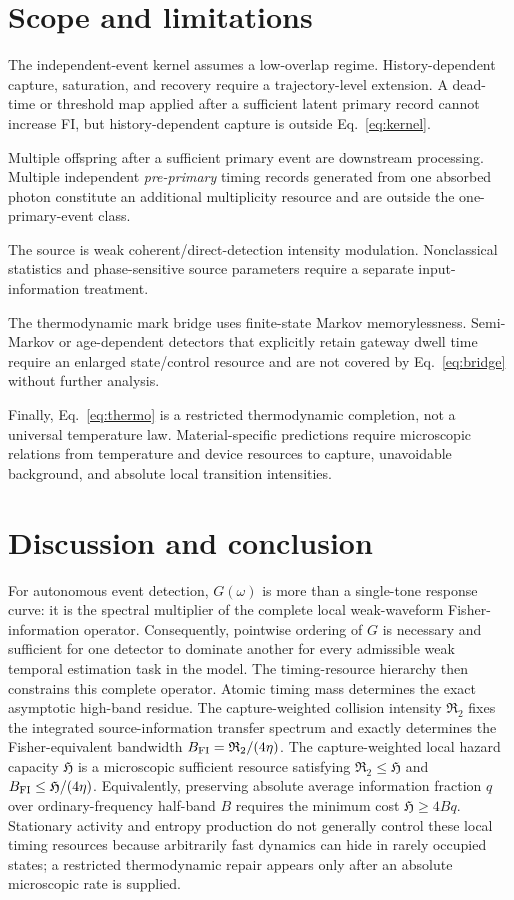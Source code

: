 \documentclass[aps,prapplied,preprint,nofootinbib]{revtex4-2}
\newcommand{\Rtwo}{\mathfrak R_2}
\newcommand{\Hcap}{\mathfrak H}
\begin{document}
\section{Scope and limitations}

The independent-event kernel assumes a low-overlap regime. History-dependent capture, saturation, and recovery require a trajectory-level extension. A dead-time or threshold map applied after a sufficient latent primary record cannot increase FI, but history-dependent capture is outside Eq.~\eqref{eq:kernel}.

Multiple offspring after a sufficient primary event are downstream processing. Multiple independent \emph{pre-primary} timing records generated from one absorbed photon constitute an additional multiplicity resource and are outside the one-primary-event class.

The source is weak coherent/direct-detection intensity modulation. Nonclassical statistics and phase-sensitive source parameters require a separate input-information treatment.

The thermodynamic mark bridge uses finite-state Markov memorylessness. Semi-Markov or age-dependent detectors that explicitly retain gateway dwell time require an enlarged state/control resource and are not covered by Eq.~\eqref{eq:bridge} without further analysis.

Finally, Eq.~\eqref{eq:thermo} is a restricted thermodynamic completion, not a universal temperature law. Material-specific predictions require microscopic relations from temperature and device resources to capture, unavoidable background, and absolute local transition intensities.

\section{Discussion and conclusion}

For autonomous event detection, $G(\omega)$ is more than a single-tone response curve: it is the spectral multiplier of the complete local weak-waveform Fisher-information operator. Consequently, pointwise ordering of $G$ is necessary and sufficient for one detector to dominate another for every admissible weak temporal estimation task in the model. The timing-resource hierarchy then constrains this complete operator. Atomic timing mass determines the exact asymptotic high-band residue. The capture-weighted collision intensity $\Rtwo$ fixes the integrated source-information transfer spectrum and exactly determines the Fisher-equivalent bandwidth $B_{\rm FI}=\Rtwo/(4\eta)$. The capture-weighted local hazard capacity $\Hcap$ is a microscopic sufficient resource satisfying $\Rtwo\le\Hcap$ and $B_{\rm FI}\le\Hcap/(4\eta)$. Equivalently, preserving absolute average information fraction $q$ over ordinary-frequency half-band $B$ requires the minimum cost $\Hcap\ge4Bq$. Stationary activity and entropy production do not generally control these local timing resources because arbitrarily fast dynamics can hide in rarely occupied states; a restricted thermodynamic repair appears only after an absolute microscopic rate is supplied.
\end{document}
